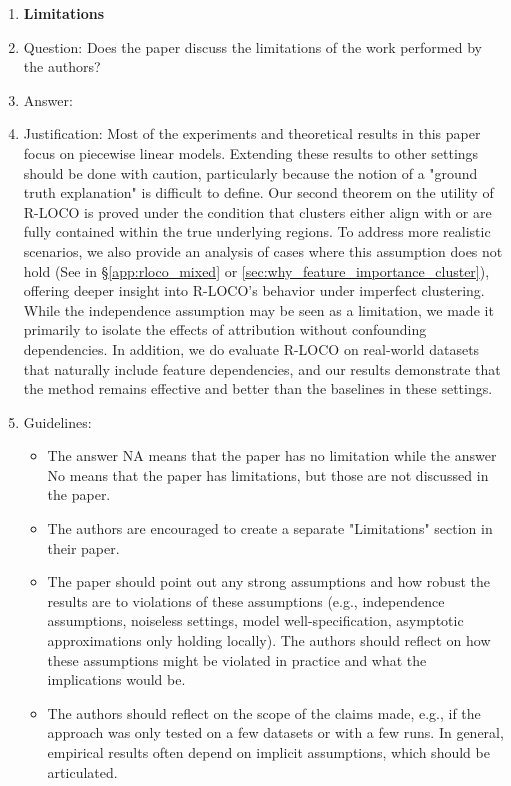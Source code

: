 \documentclass{article}
\theoremstyle{plain}
\theoremstyle{definition}
\theoremstyle{remark}
\begin{document}
\begin{enumerate}
\item {\bf Limitations}
    \item[] Question: Does the paper discuss the limitations of the work performed by the authors?
    \item[] Answer: \answerYes{} %
    \item[] Justification: Most of the experiments and theoretical results in this paper focus on piecewise linear models. Extending these results to other settings should be done with caution, particularly because the notion of a "ground truth explanation" is difficult to define. Our second theorem on the utility of R-LOCO is proved under the condition that clusters either align with or are fully contained within the true underlying regions. To address more realistic scenarios, we also provide an analysis of cases where this assumption does not hold (See in \S\ref{app:rloco_mixed} or \ref{sec:why_feature_importance_cluster}), offering deeper insight into R-LOCO’s behavior under imperfect clustering. While the independence assumption may be seen as a limitation, we made it primarily to isolate the effects of attribution without confounding dependencies. In addition, we do evaluate R-LOCO on real-world datasets that naturally include feature dependencies, and our results demonstrate that the method remains effective and better than the baselines in these settings.
    \item[] Guidelines:
    \begin{itemize}
        \item The answer NA means that the paper has no limitation while the answer No means that the paper has limitations, but those are not discussed in the paper. 
        \item The authors are encouraged to create a separate "Limitations" section in their paper.
        \item The paper should point out any strong assumptions and how robust the results are to violations of these assumptions (e.g., independence assumptions, noiseless settings, model well-specification, asymptotic approximations only holding locally). The authors should reflect on how these assumptions might be violated in practice and what the implications would be.
        \item The authors should reflect on the scope of the claims made, e.g., if the approach was only tested on a few datasets or with a few runs. In general, empirical results often depend on implicit assumptions, which should be articulated.

\end{itemize}
\end{enumerate}
\end{document}
